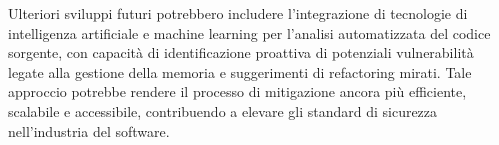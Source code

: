 Ulteriori sviluppi futuri potrebbero includere l'integrazione di tecnologie di intelligenza
artificiale e machine learning per l'analisi automatizzata del codice sorgente,
con capacità di identificazione proattiva di potenziali vulnerabilità legate
alla gestione della memoria e suggerimenti di refactoring mirati. Tale approccio
potrebbe rendere il processo di mitigazione ancora più efficiente, scalabile e
accessibile, contribuendo a elevare gli standard di sicurezza nell'industria del
software.

